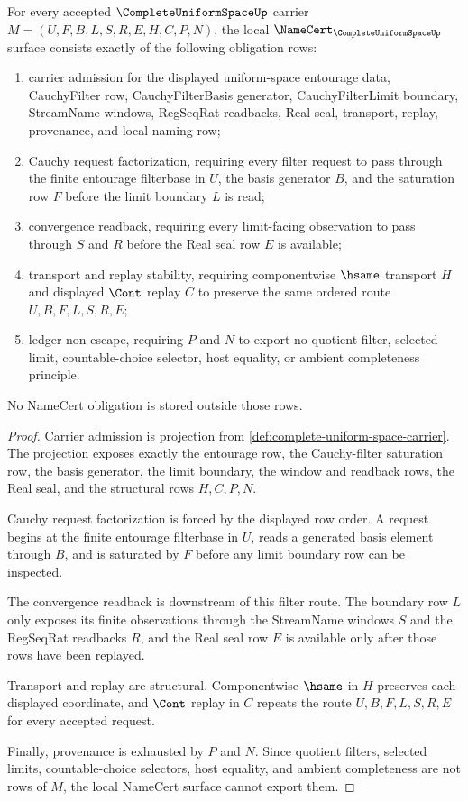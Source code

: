 \begin{theorem}
\label{thm:complete-uniform-space-namecert-obligations}
For every accepted $\CompleteUniformSpaceUp$ carrier $M=(U,F,B,L,S,R,E,H,C,P,N)$, the local $\NameCert_{\CompleteUniformSpaceUp}$ surface consists exactly of the following obligation rows:
\begin{enumerate}
\item carrier admission for the displayed uniform-space entourage data, CauchyFilter row, CauchyFilterBasis generator, CauchyFilterLimit boundary, StreamName windows, RegSeqRat readbacks, Real seal, transport, replay, provenance, and local naming row;
\item Cauchy request factorization, requiring every filter request to pass through the finite entourage filterbase in $U$, the basis generator $B$, and the saturation row $F$ before the limit boundary $L$ is read;
\item convergence readback, requiring every limit-facing observation to pass through $S$ and $R$ before the Real seal row $E$ is available;
\item transport and replay stability, requiring componentwise $\hsame$ transport $H$ and displayed $\Cont$ replay $C$ to preserve the same ordered route $U,B,F,L,S,R,E$;
\item ledger non-escape, requiring $P$ and $N$ to export no quotient filter, selected limit, countable-choice selector, host equality, or ambient completeness principle.
\end{enumerate}
No NameCert obligation is stored outside those rows.
\end{theorem}
\begin{proof}
Carrier admission is projection from \autoref{def:complete-uniform-space-carrier}. The projection exposes exactly the entourage row, the Cauchy-filter saturation row, the basis generator, the limit boundary, the window and readback rows, the Real seal, and the structural rows $H,C,P,N$.

Cauchy request factorization is forced by the displayed row order. A request begins at the finite entourage filterbase in $U$, reads a generated basis element through $B$, and is saturated by $F$ before any limit boundary row can be inspected.

The convergence readback is downstream of this filter route. The boundary row $L$ only exposes its finite observations through the StreamName windows $S$ and the RegSeqRat readbacks $R$, and the Real seal row $E$ is available only after those rows have been replayed.

Transport and replay are structural. Componentwise $\hsame$ in $H$ preserves each displayed coordinate, and $\Cont$ replay in $C$ repeats the route $U,B,F,L,S,R,E$ for every accepted request.

Finally, provenance is exhausted by $P$ and $N$. Since quotient filters, selected limits, countable-choice selectors, host equality, and ambient completeness are not rows of $M$, the local NameCert surface cannot export them.
\end{proof}

